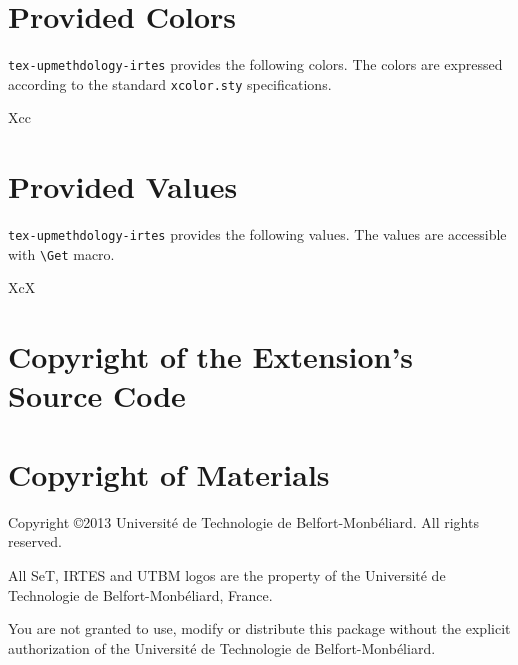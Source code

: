 \documentclass[article]{upmethodology-document}
\gdef\upmextensiondoccolorlist{}
\gdef\upmextensiondocvaluelist{}
\begin{document}
\section{Provided Colors}

\texttt{tex-upmethdology-irtes} provides the following colors. The colors are expressed according to the standard \texttt{xcolor.sty} specifications.

\begin{mtabular}{3}{Xcc}
\upmextensiondoccolorlist
\end{mtabular}

\section{Provided Values}

\texttt{tex-upmethdology-irtes} provides the following values. The values are accessible with \texttt{{\textbackslash}Get} macro.

\begin{mtabular}{3}{XcX}
\upmextensiondocvaluelist
\end{mtabular}

\section{Copyright of the Extension's Source Code}



\section{Copyright of Materials}

Copyright \copyright 2013 Universit\'e de Technologie de Belfort-Monb\'eliard. All rights reserved.

All SeT, IRTES and UTBM logos are the property of the Universit\'e de Technologie de Belfort-Monb\'eliard, France.

You are not granted to use, modify or distribute this package without the explicit authorization of the Universit\'e de Technologie de Belfort-Monb\'eliard.
\end{document}
